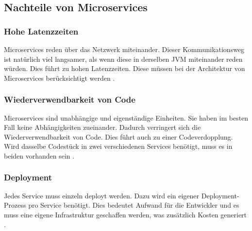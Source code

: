 \subsection{Nachteile von Microservices}
\subsubsection{Hohe Latenzzeiten}
Microservices reden über das Netzwerk miteinander. Dieser Kommunikationsweg ist natürlich viel langsamer, als wenn diese in derselben JVM miteinander reden würden. Dies führt zu hohen Latenzzeiten. Diese müssen bei der Architektur von Microservices berücksichtigt werden \cite{Newman2015}.

\subsubsection{Wiederverwendbarkeit von Code}
Microservices sind unabhängige und eigenständige Einheiten. Sie haben im besten Fall keine Abhängigkeiten zueinander. Dadurch verringert sich die Wiederverwendbarkeit von Code. Dies führt auch zu einer Codeverdopplung. Wird dasselbe Codestück in zwei verschiedenen Services benötigt, muss es in beiden vorhanden sein \cite{Newman2015}.

\subsubsection{Deployment}
Jedes Service muss einzeln deployt werden. Dazu wird ein eigener Deployment-Prozess pro Service benötigt. Dies bedeutet Aufwand für die Entwickler und es muss eine eigene Infrastruktur geschaffen werden, was zusätzlich Kosten generiert \cite{Newman2015}.
